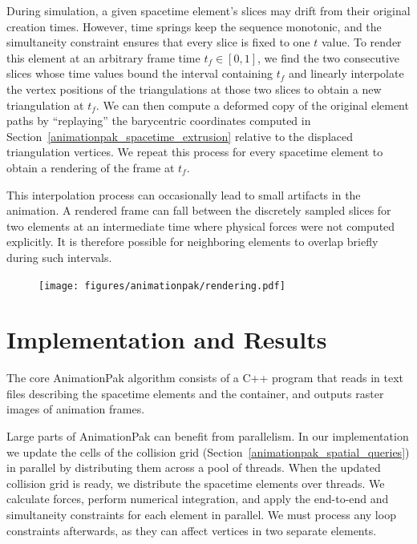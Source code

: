 During simulation, a given spacetime element's slices may drift from their
original creation times.  However, time springs keep the sequence
monotonic, and the simultaneity constraint ensures that every slice
is fixed to one $t$ value.  To render this element at an arbitrary
frame time $t_f\in[0,1]$, we find the two consecutive slices whose
time values
bound the interval containing $t_f$ and linearly interpolate the vertex
positions of the triangulations at those two slices to obtain a new
triangulation at $t_f$.  We can then compute a deformed copy of the
original element paths by ``replaying'' the barycentric coordinates 
computed in Section~\ref{animationpak_spacetime_extrusion} relative to the displaced
triangulation vertices.  We repeat this process for every spacetime element
to obtain a rendering of the frame at $t_f$.

This interpolation process can occasionally lead to small artifacts in 
the animation.  A rendered frame can fall between
the discretely sampled slices for two elements at an intermediate time
where physical forces were not computed explicitly.  It is therefore
possible for neighboring elements to overlap briefly during such intervals.

\begin{figure}
\centering
\texttt{[image: figures/animationpak/rendering.pdf]} 
\caption[An illustration of rendering spacetime elements]
{\label{fig_animationpak_render} 
}
\end{figure}


\section{Implementation and Results}
\label{animationpak_implementation_and_results}


The core AnimationPak algorithm consists of a C++ program that reads 
in text files describing the spacetime elements and the container, 
and outputs raster images of animation frames.

Large parts of AnimationPak can benefit from parallelism.  In
our implementation we update the cells of the collision grid
(Section~\ref{animationpak_spatial_queries}) in parallel by distributing them
across a pool of threads.  When the updated collision grid is ready,
we distribute the spacetime elements over threads.  We calculate
forces, perform numerical integration, and apply the end-to-end and
simultaneity constraints for each element in parallel.  We must
process any loop constraints afterwards, as they can affect vertices in
two separate elements.

